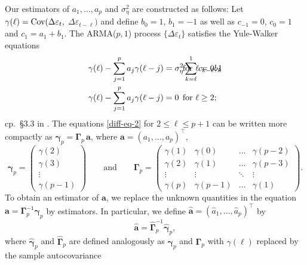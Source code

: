 Our estimators of $a_1,\ldots,a_p$ and $\sigma_\eta^2$ are constructed as follows: Let $\gamma(\ell) = \textnormal{Cov}(\Delta \varepsilon_t,$ $\Delta \varepsilon_{t-\ell})$ and define $b_0 = 1$, $b_1 = -1$ as well as $c_{-1} = 0$, $c_0 = 1$ and $c_1 = a_1 + b_1$. The ARMA($p,1$) process $\{ \Delta \varepsilon_t \}$ satisfies the Yule-Walker equations
\begin{align}
\gamma(\ell) - \sum\limits_{j=1}^p a_j \gamma(\ell-j) & = \sigma_\eta^2 \sum_{k=\ell}^1 c_{k-\ell} b_k \hspace{-2cm} & & \text{for } \ell = 0,1 \label{diff-eq-1} \\
\gamma(\ell) - \sum\limits_{j=1}^p a_j \gamma(\ell-j) & = 0 \hspace{-2cm} & & \text{for } \ell \ge 2; \label{diff-eq-2}  
\end{align}
cp.\ \S3.3 in \cite{BrockwellDavis1991}. The equations \eqref{diff-eq-2} for $2 \le \ell \le p+1$ can be written more compactly as $\boldsymbol{\gamma}_p = \boldsymbol{\Gamma}_p \, \boldsymbol{a}$, where $\boldsymbol{a} = (a_1,\ldots,a_p)^\top$,
\[ \boldsymbol{\gamma}_p = 
\begin{pmatrix} 
\gamma(2) \\ \gamma(3) \\ \vdots \\ \gamma(p-1)    
\end{pmatrix}
\qquad \text{and} \qquad  
\boldsymbol{\Gamma}_p = 
\begin{pmatrix} 
\gamma(1) & \gamma(0)   & \dots   & \gamma(p-2) \\
\gamma(2) & \gamma(1)   & \dots   & \gamma(p-3) \\
\vdots    & \vdots      &  \ddots & \vdots      \\
\gamma(p) & \gamma(p-1) & \dots   & \gamma(1)
\end{pmatrix}. \] 
To obtain an estimator of $\boldsymbol{a}$, we replace the unknown quantities in the equation $\boldsymbol{a} = \boldsymbol{\Gamma}_p^{-1} \boldsymbol{\gamma}_p$ by estimators. In particular, we define $\widehat{\boldsymbol{a}} = (\widehat{a}_1,\ldots,\widehat{a}_p)^\top$ by 
\begin{equation}\label{est-AR-par}  
\widehat{\boldsymbol{a}} = \widehat{\boldsymbol{\Gamma}}_p^{-1} \widehat{\boldsymbol{\gamma}}_p,
\end{equation}
where $\widehat{\boldsymbol{\gamma}}_p$ and $\widehat{\boldsymbol{\Gamma}}_p$ are defined analogously as $\boldsymbol{\gamma}_p$ and $\boldsymbol{\Gamma}_p$ with $\gamma(\ell)$ replaced by the sample autocovariance 
